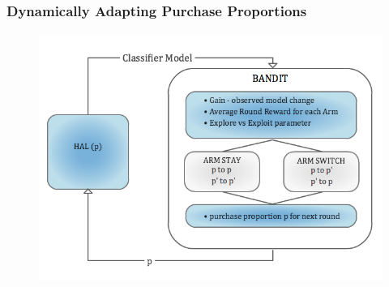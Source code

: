 \documentclass{beamer}
\begin{document}
\begin{frame}
    \frametitle{Dynamically Adapting Purchase Proportions}  %
    \framesubtitle{}
    \begin{figure}[!htb]
        \centering
        \includegraphics[width=1.0\columnwidth]{fig/BANDIT}
        \label{fig:BANDIT}
    \end{figure}
\end{frame}
\end{document}
